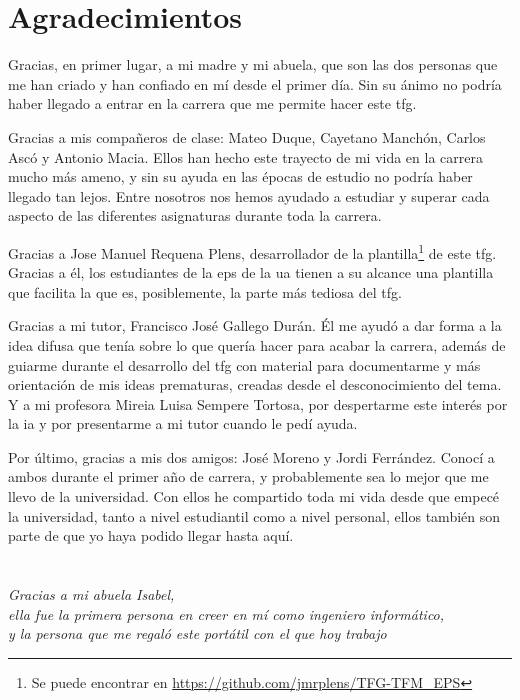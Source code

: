 \cleardoublepage %
\chapter*{Agradecimientos}

\thispagestyle{empty}
\vspace{1cm}

Gracias, en primer lugar, a mi madre y mi abuela, que son las dos personas que me han criado y han confiado en mí desde el primer día. Sin su ánimo no podría haber llegado a entrar en la carrera que me permite hacer este \gls{tfg}.

Gracias a mis compañeros de clase: Mateo Duque, Cayetano Manchón, Carlos Ascó y Antonio Macia. Ellos han hecho este trayecto de mi vida en la carrera mucho más ameno, y sin su ayuda en las épocas de estudio no podría haber llegado tan lejos. Entre nosotros nos hemos ayudado a estudiar y superar cada aspecto de las diferentes asignaturas durante toda la carrera. 

Gracias a Jose Manuel Requena Plens, desarrollador de la plantilla\footnote{Se puede encontrar en \url{https://github.com/jmrplens/TFG-TFM\_EPS}} de este \gls{tfg}. Gracias a él, los estudiantes de la \gls{eps} de la \gls{ua} tienen a su alcance una plantilla que facilita la que es, posiblemente, la parte más tediosa del \gls{tfg}.

Gracias a mi tutor, Francisco José Gallego Durán. Él me ayudó a dar forma a la idea difusa que tenía sobre lo que quería hacer para acabar la carrera, además de guiarme durante el desarrollo del \gls{tfg} con material para documentarme y más orientación de mis ideas prematuras, creadas desde el desconocimiento del tema. Y a mi profesora Mireia Luisa Sempere Tortosa, por despertarme este interés por la \gls{ia} y por presentarme a mi tutor cuando le pedí ayuda.

Por último, gracias a mis dos amigos: José Moreno y Jordi Ferrández. Conocí a ambos durante el primer año de carrera, y probablemente sea lo mejor que me llevo de la universidad. Con ellos he compartido toda mi vida desde que empecé la universidad, tanto a nivel estudiantil como a nivel personal, ellos también son parte de que yo haya podido llegar hasta aquí.

\cleardoublepage %
\chapter*{}
\setlength{\leftmargin}{0.5\textwidth}
\setlength{\parsep}{0cm}
\addtolength{\topsep}{0.5cm}
\begin{flushright}
\small\em{
Gracias a mi abuela Isabel,\\
ella fue la primera persona en creer en mí como ingeniero informático,\\
y la persona que me regaló este portátil con el que hoy trabajo
}
\end{flushright}


